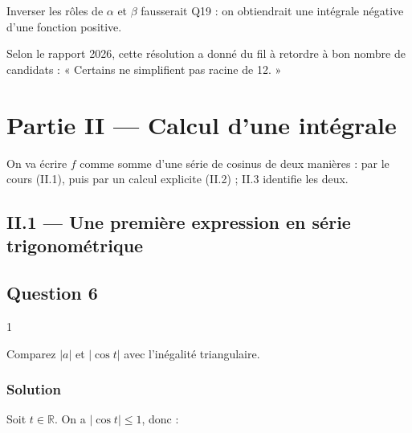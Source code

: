 \documentclass[11pt,a4paper]{article}
\begin{document}
\begin{piege}

Inverser les rôles de \(\alpha\) et \(\beta\) fausserait Q19 : on obtiendrait une intégrale négative d'une fonction positive.

\end{piege}

\begin{jury}

Selon le rapport 2026, cette résolution a donné du fil à retordre à bon nombre de candidats : « Certains ne simplifient pas racine de 12. »

\end{jury}

\hypertarget{partie-ii-calcul-dune-intuxe9grale}{%
\section{Partie II --- Calcul d'une intégrale}\label{partie-ii-calcul-dune-intuxe9grale}}

On va écrire \(f\) comme somme d'une série de cosinus de deux manières : par le cours (II.1), puis par un calcul explicite (II.2) ; II.3 identifie les deux.

\hypertarget{ii.1-une-premiuxe8re-expression-en-suxe9rie-trigonomuxe9trique}{%
\subsection{II.1 --- Une première expression en série trigonométrique}\label{ii.1-une-premiuxe8re-expression-en-suxe9rie-trigonomuxe9trique}}

\hypertarget{question-6}{%
\subsection{Question 6}\label{question-6}}

\begin{indication}{1}

Comparez \(|a|\) et \(|\cos t|\) avec l'inégalité triangulaire.

\end{indication}

\hypertarget{solution-5}{%
\subsubsection{Solution}\label{solution-5}}

Soit \(t\in\mathbb R\). On a \(|\cos t|\le1\), donc :
\end{document}
